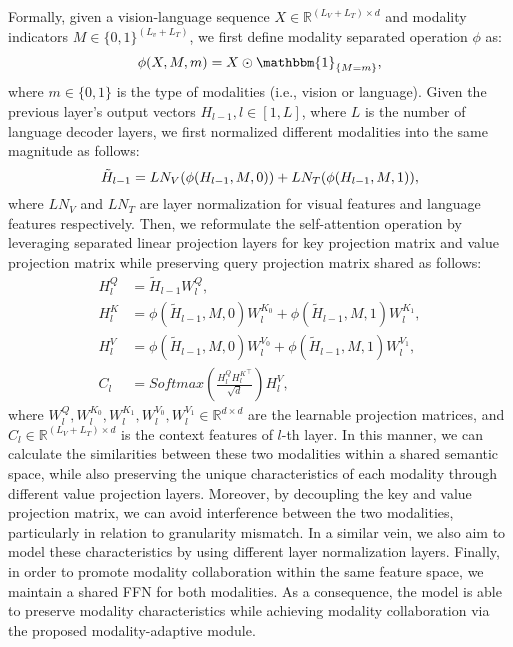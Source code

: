 \documentclass[10pt,twocolumn,letterpaper]{article}
\begin{document}
Formally, given a vision-language sequence $X \in \mathbb{R}^{(L_V + L_T) \times d}$ and modality indicators $M \in {\{0, 1\}}^{(L_v + L_T)}$, we first define modality separated operation $\phi$ as:
\begin{align}
    \phi(X, M, m) = X \odot \mathbbm{1}_{\{M = m\}},
\end{align}
where $m \in \{0,1\}$ is the type of modalities (i.e., vision or language). Given the previous layer's output vectors $H_{l-1}, l\in[1, L]$, where $L$ is the number of language decoder layers, we first normalized different modalities into the same magnitude as follows:
\begin{equation}
    \small
    \tilde{H}_{l-1} = LN_V(\phi(H_{l-1}, M, 0)) + LN_T(\phi(H_{l-1}, M, 1)),
\end{equation}
where $LN_V$ and $LN_T$ are layer normalization \cite{ba2016layer} for visual features and language features respectively. Then, we reformulate the self-attention operation by leveraging separated linear projection layers for key projection matrix and value projection matrix while preserving query projection matrix shared as follows:
\begin{align}
    H^Q_{l} &= \tilde{H}_{l-1} W^Q_l, \\ 
    H^K_{l} &= \phi(\tilde{H}_{l-1}, M, 0) W^{K_0}_l + \phi(\tilde{H}_{l-1}, M, 1) W^{K_1}_l, \\
    H^V_{l} &= \phi(\tilde{H}_{l-1}, M, 0) W^{V_0}_l + \phi(\tilde{H}_{l-1}, M, 1) W^{V_1}_l, \\
    C_{l} &= Softmax\left(\frac{H^Q_{l} {H^K_{l}}^\top}{\sqrt{d}}\right)H^V_{l},
\end{align}
where $W^Q_l, W^{K_0}_l, W^{K_1}_l, W^{V_0}_l, W^{V_1}_l \in \mathbb{R}^{d\times d}$ are the learnable projection matrices, and $C_l \in \mathbb{R}^{(L_V + L_T) \times d}$ is the context features of $l$-th layer. In this manner, we can calculate the similarities between these two modalities within a shared semantic space, while also preserving the unique characteristics of each modality through different value projection layers. Moreover, by decoupling the key and value projection matrix, we can avoid interference between the two modalities, particularly in relation to granularity mismatch. In a similar vein, we also aim to model these characteristics by using different layer normalization layers. Finally, in order to promote modality collaboration within the same feature space, we maintain a shared FFN for both modalities. 
As a consequence, the model is able to preserve modality characteristics while achieving modality collaboration via the proposed modality-adaptive module.
\end{document}
